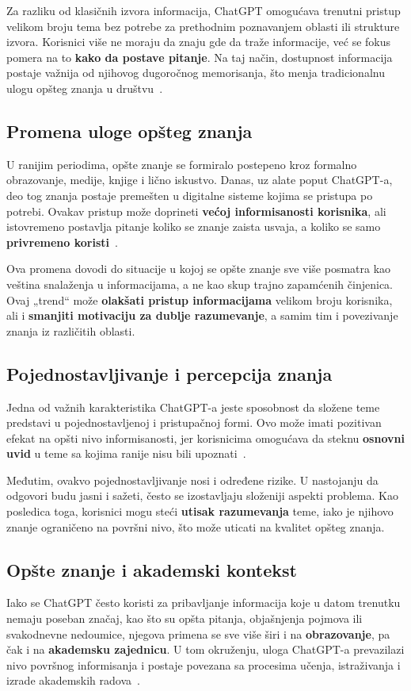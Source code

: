 \documentclass[a4paper, 12pt]{article}
\begin{document}
Za razliku od klasičnih izvora informacija, ChatGPT omogućava trenutni pristup velikom broju tema bez potrebe za prethodnim poznavanjem oblasti ili strukture izvora.
Korisnici više ne moraju da znaju gde da traže informacije, već se fokus pomera na to \textbf{kako da postave pitanje}. Na taj način, dostupnost informacija postaje važnija od njihovog dugoročnog memorisanja, što menja tradicionalnu ulogu opšteg znanja u društvu~\cite{russell2020}.

\subsection{Promena uloge opšteg znanja}

U ranijim periodima, opšte znanje se formiralo postepeno kroz formalno obrazovanje, medije, knjige i lično iskustvo. Danas, uz alate poput ChatGPT-a, deo tog znanja postaje premešten u digitalne sisteme kojima se pristupa po potrebi. 
Ovakav pristup može doprineti \textbf{većoj informisanosti korisnika}, ali istovremeno postavlja pitanje koliko se znanje zaista usvaja, a koliko se samo \textbf{privremeno koristi}~\cite{bender2021}.

Ova promena dovodi do situacije u kojoj se opšte znanje sve više posmatra kao veština snalaženja u informacijama, a ne kao skup trajno zapamćenih činjenica. Ovaj „trend“ može \textbf{olakšati pristup informacijama} velikom broju korisnika, ali i \textbf{smanjiti motivaciju za dublje razumevanje}, a samim tim i povezivanje znanja iz različitih oblasti.

\subsection{Pojednostavljivanje i percepcija znanja}

Jedna od važnih karakteristika ChatGPT-a jeste sposobnost da složene teme predstavi u pojednostavljenoj i pristupačnoj formi. Ovo može imati pozitivan efekat na opšti nivo informisanosti, jer korisnicima omogućava da steknu \textbf{osnovni uvid} u teme sa kojima ranije nisu bili upoznati~\cite{openai2023}.

Međutim, ovakvo pojednostavljivanje nosi i određene rizike. U nastojanju da odgovori budu jasni i sažeti, često se izostavljaju složeniji aspekti problema. Kao posledica toga, korisnici mogu steći \textbf{utisak razumevanja} teme, iako je njihovo znanje ograničeno na površni nivo, što može uticati na kvalitet opšteg znanja.


\subsection{Opšte znanje i akademski kontekst}
Iako se ChatGPT često koristi za pribavljanje informacija koje u datom trenutku nemaju poseban značaj, kao što su opšta pitanja, objašnjenja pojmova ili svakodnevne nedoumice, njegova primena se sve više širi i na \textbf{obrazovanje}, pa čak i na \textbf{akademsku zajednicu}. U tom okruženju, uloga ChatGPT-a prevazilazi nivo površnog informisanja i postaje povezana sa procesima učenja, istraživanja i izrade akademskih radova~\cite{openai2023}.
\end{document}
